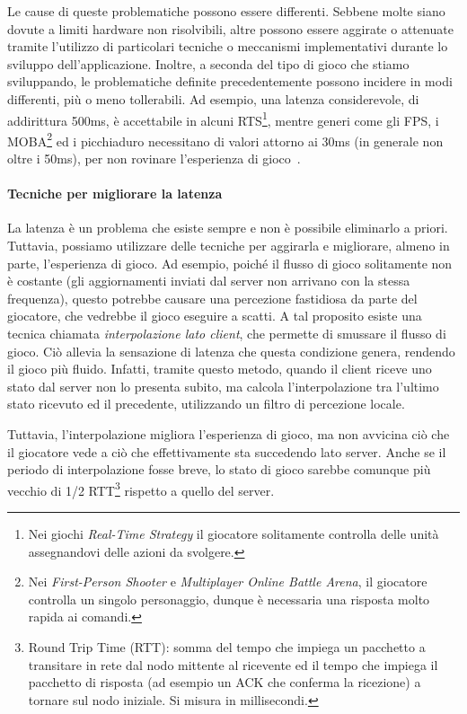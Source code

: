 Le cause di queste problematiche possono essere differenti. Sebbene molte siano dovute a limiti hardware non risolvibili, altre possono essere aggirate o attenuate tramite l'utilizzo di particolari tecniche o meccanismi implementativi durante lo sviluppo dell'applicazione.
Inoltre, a seconda del tipo di gioco che stiamo sviluppando, le problematiche definite precedentemente possono incidere in modi differenti, più o meno tollerabili. Ad esempio, una latenza considerevole, di addirittura 500ms, è accettabile in alcuni RTS\footnote{Nei giochi \emph{Real-Time Strategy} il giocatore solitamente controlla delle unità assegnandovi delle azioni da svolgere.}, mentre generi come gli FPS, i MOBA\footnote{Nei \emph{First-Person Shooter} e \emph{Multiplayer Online Battle Arena}, il giocatore controlla un singolo personaggio, dunque è necessaria una risposta molto rapida ai comandi.} ed i picchiaduro necessitano di valori attorno ai 30ms (in generale non oltre i 50ms), per non rovinare l'esperienza di gioco~\cite{book:networkingandonlinegames, book:multiplayergameprogramming}.

\paragraph{Tecniche per migliorare la latenza}
La latenza è un problema che esiste sempre e non è possibile eliminarlo a priori. Tuttavia, possiamo utilizzare delle tecniche per aggirarla e migliorare, almeno in parte, l'esperienza di gioco. Ad esempio, poiché il flusso di gioco solitamente non è costante (gli aggiornamenti inviati dal server non arrivano con la stessa frequenza), questo potrebbe causare una percezione fastidiosa da parte del giocatore, che vedrebbe il gioco eseguire a scatti. A tal proposito esiste una tecnica chiamata \emph{interpolazione lato client}, che permette di smussare il flusso di gioco. Ciò allevia la sensazione di latenza che questa condizione genera, rendendo il gioco più fluido. Infatti, tramite questo metodo, quando il client riceve uno stato dal server non lo presenta subito, ma calcola l'interpolazione tra l'ultimo stato ricevuto ed il precedente, utilizzando un filtro di percezione locale.

Tuttavia, l'interpolazione migliora l'esperienza di gioco, ma non avvicina ciò che il giocatore vede a ciò che effettivamente sta succedendo lato server. Anche se il periodo di interpolazione fosse breve, lo stato di gioco sarebbe comunque più vecchio di 1/2 RTT\footnote{Round Trip Time (RTT): somma del tempo che impiega un pacchetto a transitare in rete dal nodo mittente al ricevente ed il tempo che impiega il pacchetto di risposta (ad esempio un ACK che conferma la ricezione) a tornare sul nodo iniziale. Si misura in millisecondi.} rispetto a quello del server.

